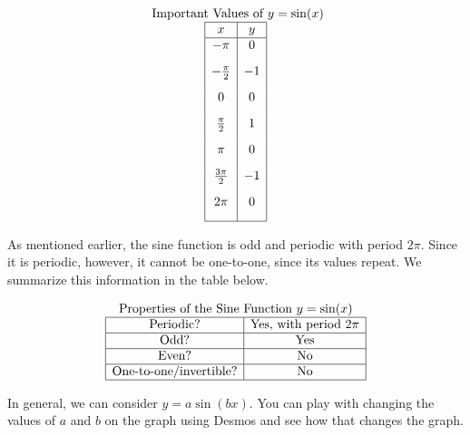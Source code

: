 \documentclass[nooutcomes]{ximera}
\begin{document}
\begin{center}
\end{center}

\[
\begin{array}{ c }
 \text{ Important Values of  $y=\sin(x)$}\\
\begin{array}{|c|c|}
 \hline
 x & y\\
 \hline
 -\pi&0\\[2ex]
 -\frac{\pi}{2}&-1\\[2ex]
 0&0\\[2ex]
 \frac{\pi}{2}&1\\[2ex]
 \pi&0\\[2ex]
\frac{3\pi}{2}&-1\\[2ex]
 2 \pi&0\\[2ex]
\hline
\end{array}
\end{array}
\]


As mentioned earlier, the sine function is odd and periodic with period $2\pi$. Since it is periodic, however, it cannot be one-to-one, since its values repeat. We summarize this information in the table below.

\[
\begin{array}{ c }
 \text{\normalfont Properties of the Sine Function } y=\sin(x) \\
\begin{array}{|c|c|}
 \hline
\text{Periodic?} & \text{Yes, with period }2\pi \\ \hline
\text{Odd?} & \text{Yes} \\ \hline
\text{Even?} & \text{No} \\ \hline
\text{One-to-one/invertible?} & \text{No} \\ \hline
\end{array}
\end{array}
\]

In general, we can consider $y=a\sin(bx)$.  You can play with changing the values of $a$ and $b$ on the graph using Desmos and see how that changes the graph.  
\end{document}
